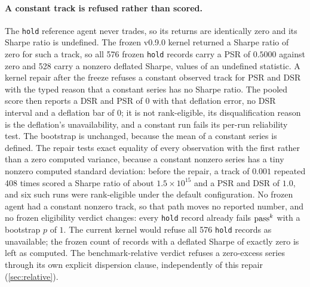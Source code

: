 \paragraph{A constant track is refused rather than scored.} The \texttt{hold} reference agent never trades, so its returns are identically zero and its Sharpe ratio is undefined. The frozen v0.9.0 kernel returned a Sharpe ratio of zero for such a track, so all 576 frozen \texttt{hold} records carry a PSR of $0.5000$ against zero and 528 carry a nonzero deflated Sharpe, values of an undefined statistic. A kernel repair after the freeze refuses a constant observed track for PSR and DSR with the typed reason that a constant series has no Sharpe ratio. The pooled score then reports a DSR and PSR of $0$ with that deflation error, no DSR interval and a deflation bar of $0$; it is not rank-eligible, its disqualification reason is the deflation's unavailability, and a constant run fails its per-run reliability test. The bootstrap is unchanged, because the mean of a constant series is defined. The repair tests exact equality of every observation with the first rather than a zero computed variance, because a constant nonzero series has a tiny nonzero computed standard deviation: before the repair, a track of $0.001$ repeated 408 times scored a Sharpe ratio of about $1.5 \times 10^{15}$ and a PSR and DSR of $1.0$, and six such runs were rank-eligible under the default configuration. No frozen agent had a constant nonzero track, so that path moves no reported number, and no frozen eligibility verdict changes: every \texttt{hold} record already fails $\text{pass}^{k}$ with a bootstrap $p$ of $1$. The current kernel would refuse all 576 \texttt{hold} records as unavailable; the frozen count of records with a deflated Sharpe of exactly zero is left as computed. The benchmark-relative verdict refuses a zero-excess series through its own explicit dispersion clause, independently of this repair (\cref{sec:relative}).

